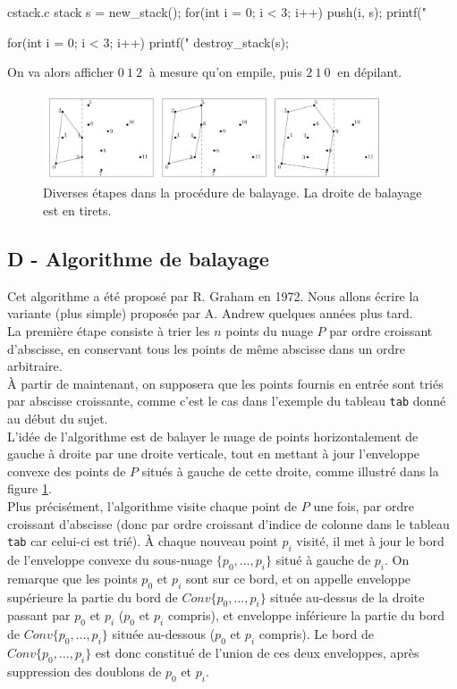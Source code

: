 \documentclass[a4paper,french,bookmarks]{article}
\begin{document}
\begin{code}{c}{stack.c}
stack s = new_stack();
for(int i = 0; i < 3; i++) {
    push(i, s);
    printf("%
}

for(int i = 0; i < 3; i++)
    printf("%
destroy_stack(s);
\end{code}

On va alors afficher $0\ 1\ 2\ $ à mesure qu’on empile, puis $2\ 1\ 0\ $ en dépilant.
\begin{figure}[!ht]
    \centering
    \includegraphics[width=0.9\textwidth]{dm1/figure4.jpg}
    \caption{Diverses étapes dans la procédure de balayage. La droite de balayage est en tirets.}
    \label{fig:fig4}
\end{figure}

\subsection*{D - Algorithme de balayage} Cet algorithme a été proposé par R. Graham en 1972. Nous allons écrire la variante (plus simple) proposée par A. Andrew quelques années plus tard.\\

La première étape consiste à trier les $n$ points du nuage $P$ par ordre croissant d’abscisse, en conservant tous les points de même abscisse dans un ordre arbitraire.\\

À partir de maintenant, on supposera que les points fournis en entrée sont triés par abscisse croissante, comme c’est le cas dans l’exemple du tableau \verb|tab| donné au début du sujet.\\

L’idée de l’algorithme est de balayer le nuage de points horizontalement de gauche à droite par une droite verticale, tout en mettant à jour l’enveloppe convexe des points de $P$ situés à gauche de cette droite, comme illustré dans la figure \ref{fig:fig4}.\\

Plus précisément, l’algorithme visite chaque point de $P$ une fois, par ordre croissant d’abscisse (donc par ordre croissant d’indice de colonne dans le tableau \verb|tab| car celui-ci est trié). À chaque nouveau point $p_i$ visité, il met à jour le bord de l’enveloppe convexe du sous-nuage $\{p_0, \dots , p_i\}$ situé à gauche de $p_i$. On
remarque que les points $p_0$ et $p_i$ sont sur ce bord, et on appelle enveloppe supérieure la partie du bord de $Conv\{p_0, \dots , p_i\}$ située au-dessus de la droite passant par $p_0$ et $p_i$ ($p_0$ et $p_i$ compris), et enveloppe inférieure la partie du bord de $Conv\{p_0, \dots , p_i\}$ située au-dessous ($p_0$ et $p_i$ compris). Le bord de $Conv\{p_0, \dots , p_i\}$
est donc constitué de l’union de ces deux enveloppes, après suppression des doublons de $p_0$ et $p_i$.\\
\end{document}
